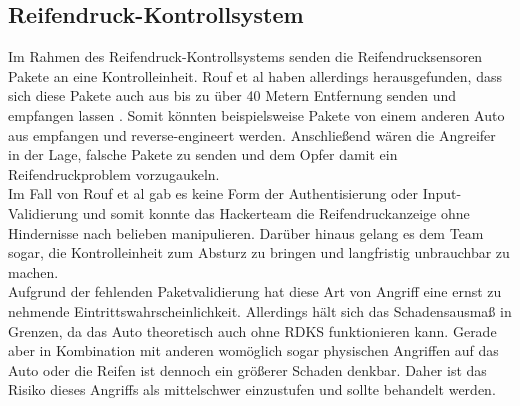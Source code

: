 \subsection{Reifendruck-Kontrollsystem}
Im Rahmen des Reifendruck-Kontrollsystems senden die Reifendrucksensoren Pakete an eine Kontrolleinheit. Rouf et al haben allerdings herausgefunden, dass sich diese Pakete auch aus bis zu über 40 Metern Entfernung senden und empfangen lassen \cite[8]{Rouf.2010}. Somit könnten beispielsweise Pakete von einem anderen Auto aus empfangen und reverse-engineert werden. Anschließend wären die Angreifer in der Lage, falsche Pakete zu senden und dem Opfer damit ein Reifendruckproblem vorzugaukeln. \\
Im Fall von Rouf et al gab es keine Form der Authentisierung oder Input-Validierung und somit konnte das Hackerteam die Reifendruckanzeige ohne Hindernisse nach belieben manipulieren. Darüber hinaus gelang es dem Team sogar, die Kontrolleinheit zum Absturz zu bringen und langfristig unbrauchbar zu machen. \cite[12]{Rouf.2010} \\
Aufgrund der fehlenden Paketvalidierung hat diese Art von Angriff eine ernst zu nehmende Eintrittswahrscheinlichkeit. Allerdings hält sich das Schadensausmaß in Grenzen, da das Auto theoretisch auch ohne \acs{RDKS} funktionieren kann. Gerade aber in Kombination mit anderen womöglich sogar physischen Angriffen auf das Auto oder die Reifen ist dennoch ein größerer Schaden denkbar. Daher ist das Risiko dieses Angriffs als mittelschwer einzustufen und sollte behandelt werden.

